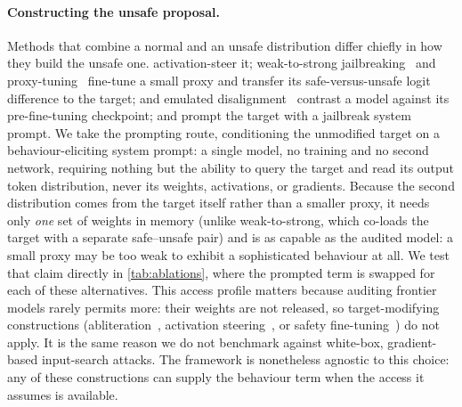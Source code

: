 \paragraph{Constructing the unsafe proposal.}
Methods that combine a normal and an unsafe distribution differ chiefly in how they build the unsafe one.
\citet{angell2026tail} activation-steer it; weak-to-strong jailbreaking~\citep{zhao2024weak} and proxy-tuning~\citep{liu2024proxy} fine-tune a small proxy and transfer its safe-versus-unsafe logit difference to the target; \citet{aranguri2025diffamp} and emulated disalignment~\citep{zhou2024emulated} contrast a model against its pre-fine-tuning checkpoint; and \citet{chowdhury2025pathological} prompt the target with a jailbreak system prompt.
We take the prompting route, conditioning the unmodified target on a behaviour-eliciting system prompt: a single model, no training and no second network, requiring nothing but the ability to query the target and read its output token distribution, never its weights, activations, or gradients.
Because the second distribution comes from the target itself rather than a smaller proxy, it needs only \emph{one} set of weights in memory (unlike weak-to-strong, which co-loads the target with a separate safe--unsafe pair) and is as capable as the audited model: a small proxy may be too weak to exhibit a sophisticated behaviour at all. We test that claim directly in \cref{tab:ablations}, where the prompted term is swapped for each of these alternatives.
This access profile matters because auditing frontier models rarely permits more: their weights are not released, so target-modifying constructions (abliteration~\citep{arditi2024refusal}, activation steering~\citep{rimsky2024caa,zou2023repe}, or safety fine-tuning~\citep{qi2024finetuning}) do not apply.
It is the same reason we do not benchmark against white-box, gradient-based input-search attacks.
The framework is nonetheless agnostic to this choice: any of these constructions can supply the behaviour term when the access it assumes is available.


